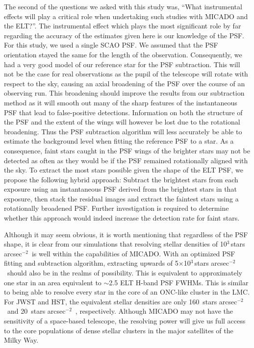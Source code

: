\documentclass{aa}
\newcommand{\s}{$\sim$}
\newcommand{\h}[1]{$^{#1}$}
\newcommand{\spa}{stars arcsec$^{-2}$~}
\begin{document}
The second of the questions we asked with this study was, ``What instrumental effects will play a critical role when undertaking such studies with MICADO and the ELT?''.
The instrumental effect which plays the most significant role by far regarding the accuracy of the estimates given here is our knowledge of the PSF\@.
For this study, we used a single SCAO PSF\@.
We assumed that the PSF orientation stayed the same for the length of the observation.
Consequently, we had a very good model of our reference star for the PSF subtraction.
This will not be the case for real observations as the pupil of the telescope will rotate with respect to the sky, causing an axial broadening of the PSF over the course of an observing run.
This broadening should improve the results from our subtraction method as it will smooth out many of the sharp features of the instantaneous PSF that lead to false-positive detections.
Information on both the structure of the PSF and the extent of the wings will however be lost due to the rotational broadening.
Thus the PSF subtraction algorithm will less accurately be able to estimate the background level when fitting the reference PSF to a star.
As a consequence, faint stars caught in the PSF wings of the brighter stars may not be detected as often as they would be if the PSF remained rotationally aligned with the sky.
To extract the most stars possible given the shape of the ELT PSF, we propose the following hybrid approach: Subtract the brightest stars from each exposure using an instantaneous PSF derived from the brightest stars in that exposure, then stack the residual images and extract the faintest stars using a rotationally broadened PSF\@.
Further investigation is required to determine whether this approach would indeed increase the detection rate for faint stars.

Although it may seem obvious, it is worth mentioning that regardless of the PSF shape, it is clear from our simulations that resolving stellar densities of 10\h3\,\spa is well within the capabilities of MICADO\@.
With an optimized PSF fitting and subtraction algorithm, extracting upwards of 5$\times$10\h3\,\spa should also be in the realms of possibility.
This is equivalent to approximately one star in an area equivalent to \s2.5 ELT H-band PSF FWHMs.
This is similar to being able to resolve every star in the core of an ONC-like cluster in the LMC\@.
For JWST and HST, the equivalent stellar densities are only 160~\spa and 20~\spa, respectively.
Although MICADO may not have the sensitivity of a space-based telescope, the resolving power will give us full access to the core populations of dense stellar clusters in the major satellites of the Milky Way.
\end{document}
